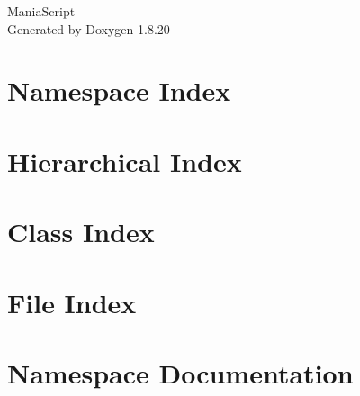 \let\mypdfximage\pdfximage\def\pdfximage{\immediate\mypdfximage}\documentclass[twoside]{book}
\newcommand{\+}{\discretionary{\mbox{\scriptsize$\hookleftarrow$}}{}{}}
\newcommand{\clearemptydoublepage}{%
  \newpage{\pagestyle{empty}\cleardoublepage}%
}
\begin{document}
\hypersetup{pageanchor=false,
             bookmarksnumbered=true,
             pdfencoding=unicode
            }
\begin{titlepage}
\vspace*{7cm}
\begin{center}%
{\Large Mania\+Script }\\
\vspace*{1cm}
{\large Generated by Doxygen 1.8.20}\\
\end{center}
\end{titlepage}
\clearemptydoublepage
{}
\tableofcontents
\clearemptydoublepage
{}
\hypersetup{pageanchor=true}

\chapter{Namespace Index}

\chapter{Hierarchical Index}

\chapter{Class Index}

\chapter{File Index}

\chapter{Namespace Documentation}






\end{document}
